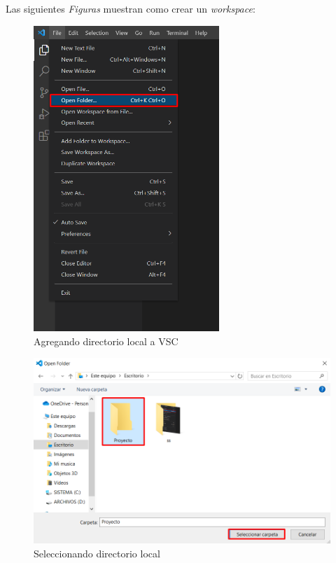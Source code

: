 Las siguientes \textit{Figuras} muestran como crear un \textit{workspace}:
\begin{figure}[H]
    \begin{center}
        \caption{Agregando directorio local a VSC}
        \label{fig: 4}
        \includegraphics[width=7cm]{capturas/creando_w1.png}
    \end{center}
\end{figure}
\begin{figure}[H]
    \begin{center}
        \caption{Seleccionando directorio local}
        \label{fig: 5}
        \includegraphics[width=12cm]{capturas/creando_w2.png}
    \end{center}
\end{figure}
